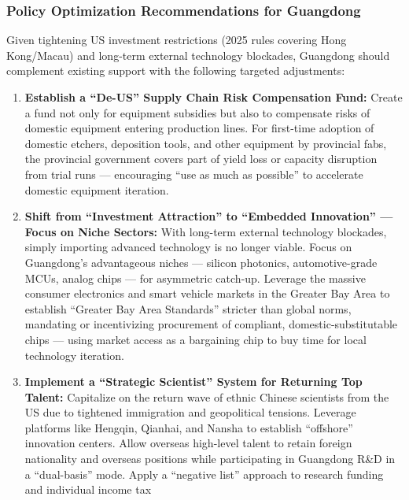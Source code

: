 \documentclass[12pt,a4paper]{article}
\begin{document}
\subsubsection{Policy Optimization Recommendations for Guangdong}

Given tightening US investment restrictions (2025 rules covering
Hong Kong/Macau) and long-term external technology blockades, Guangdong
should complement existing support with the following targeted
adjustments:

\begin{enumerate}[label=(\arabic*)]
    \item \textbf{Establish a ``De-US'' Supply Chain Risk Compensation
          Fund:} Create a fund not only for equipment subsidies but also
          to compensate risks of domestic equipment entering production
          lines. For first-time adoption of domestic etchers, deposition
          tools, and other equipment by provincial fabs, the provincial
          government covers part of yield loss or capacity disruption
          from trial runs — encouraging ``use as much as possible'' to
          accelerate domestic equipment iteration.
    \item \textbf{Shift from ``Investment Attraction'' to ``Embedded
          Innovation'' — Focus on Niche Sectors:} With long-term
          external technology blockades, simply importing advanced
          technology is no longer viable. Focus on Guangdong's
          advantageous niches — silicon photonics, automotive-grade MCUs,
          analog chips — for asymmetric catch-up. Leverage the massive
          consumer electronics and smart vehicle markets in the Greater
          Bay Area to establish ``Greater Bay Area Standards'' stricter
          than global norms, mandating or incentivizing procurement of
          compliant, domestic-substitutable chips — using market access
          as a bargaining chip to buy time for local technology iteration.
    \item \textbf{Implement a ``Strategic Scientist'' System for Returning
          Top Talent:} Capitalize on the return wave of ethnic Chinese
          scientists from the US due to tightened immigration and
          geopolitical tensions. Leverage platforms like Hengqin,
          Qianhai, and Nansha to establish ``offshore'' innovation
          centers. Allow overseas high-level talent to retain foreign
          nationality and overseas positions while participating in
          Guangdong R\&D in a ``dual-basis'' mode. Apply a ``negative
          list'' approach to research funding and individual income tax

\end{enumerate}
\end{document}
